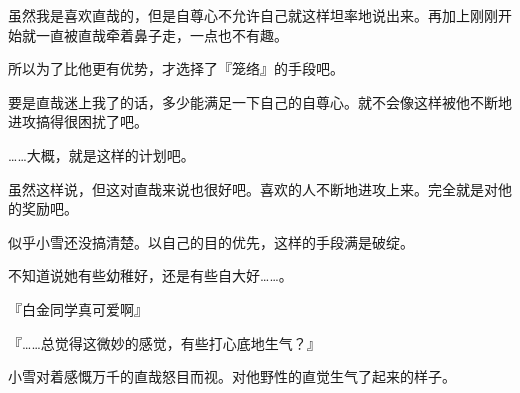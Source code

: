 虽然我是喜欢直哉的，但是自尊心不允许自己就这样坦率地说出来。再加上刚刚开始就一直被直哉牵着鼻子走，一点也不有趣。

所以为了比他更有优势，才选择了『笼络』的手段吧。

要是直哉迷上我了的话，多少能满足一下自己的自尊心。就不会像这样被他不断地进攻搞得很困扰了吧。

……大概，就是这样的计划吧。

虽然这样说，但这对直哉来说也很好吧。喜欢的人不断地进攻上来。完全就是对他的奖励吧。

似乎小雪还没搞清楚。以自己的目的优先，这样的手段满是破绽。

不知道说她有些幼稚好，还是有些自大好……。

『白金同学真可爱啊』

『……总觉得这微妙的感觉，有些打心底地生气？』

小雪对着感慨万千的直哉怒目而视。对他野性的直觉生气了起来的样子。
